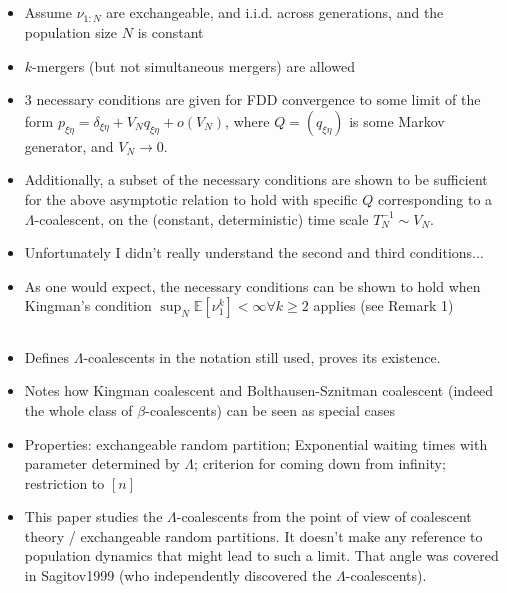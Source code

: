 \documentclass{article}
\newcommand{\E}{\mathbb{E}}
\begin{document}
\subsection*{\cite{sagitov1999}}
\begin{itemize}
\item Assume $\nu_{1:N}$ are exchangeable, and i.i.d. across generations, and the population size $N$ is constant
\item $k$-mergers (but not simultaneous mergers) are allowed
\item 3 necessary conditions are given for FDD convergence to some limit of the form $p_{\xi\eta} = \delta_{\xi\eta} + V_N q_{\xi\eta} + o(V_N)$, where $Q=(q_{\xi\eta})$ is some Markov generator, and $V_N \to 0$.
\item Additionally, a subset of the necessary conditions are shown to be sufficient for the above asymptotic relation to hold with specific $Q$ corresponding to a $\Lambda$-coalescent, on the (constant, deterministic) time scale $T_N^{-1} \sim V_N$.
\item Unfortunately I didn't really understand the second and third conditions...
\item As one would expect, the necessary conditions can be shown to hold when Kingman's condition $\sup_N \E[\nu_1^k]<\infty \forall k\geq 2$ applies (see Remark 1)
\end{itemize}


\subsection*{\cite{pitman1999}}
\begin{itemize}
\item Defines $\Lambda$-coalescents in the notation still used, proves its existence.
\item Notes how Kingman coalescent and Bolthausen-Sznitman coalescent (indeed the whole class of $\beta$-coalescents) can be seen as special cases
\item Properties: exchangeable random partition; Exponential waiting times with parameter determined by $\Lambda$; criterion for coming down from infinity; restriction to $[n]$
\item This paper studies the $\Lambda$-coalescents from the point of view of coalescent theory / exchangeable random partitions. It doesn't make any reference to population dynamics that might lead to such a limit. That angle was covered in Sagitov1999 (who independently discovered the $\Lambda$-coalescents).
\end{itemize}
\end{document}
